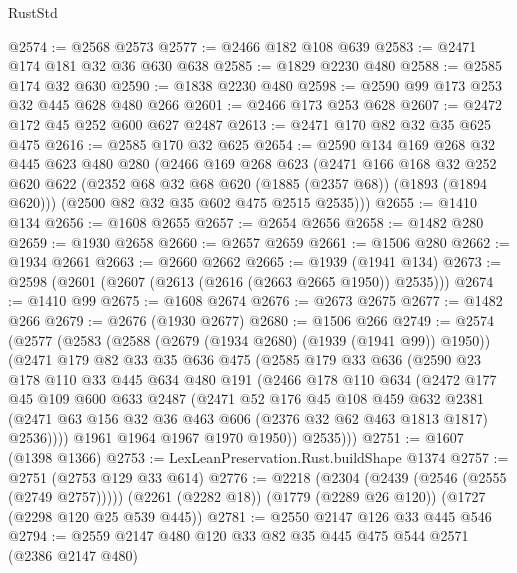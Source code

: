 \begin{lexlean}{RustStd}
\begin{coremodule}
@2574 := @2568 @2573
@2577 := @2466 @182 @108 @639
@2583 := @2471 @174 @181 @32 @36 @630 @638
@2585 := @1829 @2230 @480
@2588 := @2585 @174 @32 @630
@2590 := @1838 @2230 @480
@2598 := @2590 @99 @173 @253 @32 @445 @628 @480 @266
@2601 := @2466 @173 @253 @628
@2607 := @2472 @172 @45 @252 @600 @627 @2487
@2613 := @2471 @170 @82 @32 @35 @625 @475
@2616 := @2585 @170 @32 @625
@2654 := @2590
    @134
    @169
    @268
    @32
    @445
    @623
    @480
    @280
    (@2466
      @169
      @268
      @623
      (@2471
        @166
        @168
        @32
        @252
        @620
        @622
        (@2352 @68 @32 @68 @620 (@1885 (@2357 @68)) (@1893 (@1894 @620)))
        (@2500 @82 @32 @35 @602 @475 @2515 @2535)))
@2655 := @1410 @134
@2656 := @1608 @2655
@2657 := @2654 @2656
@2658 := @1482 @280
@2659 := @1930 @2658
@2660 := @2657 @2659
@2661 := @1506 @280
@2662 := @1934 @2661
@2663 := @2660 @2662
@2665 := @1939 (@1941 @134)
@2673 := @2598 (@2601 (@2607 (@2613 (@2616 (@2663 @2665 @1950)) @2535)))
@2674 := @1410 @99
@2675 := @1608 @2674
@2676 := @2673 @2675
@2677 := @1482 @266
@2679 := @2676 (@1930 @2677)
@2680 := @1506 @266
@2749 := @2574
    (@2577
      (@2583
        (@2588 (@2679 (@1934 @2680) (@1939 (@1941 @99)) @1950))
        (@2471
          @179
          @82
          @33
          @35
          @636
          @475
          (@2585
            @179
            @33
            @636
            (@2590
              @23
              @178
              @110
              @33
              @445
              @634
              @480
              @191
              (@2466
                @178
                @110
                @634
                (@2472
                  @177
                  @45
                  @109
                  @600
                  @633
                  @2487
                  (@2471
                    @52
                    @176
                    @45
                    @108
                    @459
                    @632
                    @2381
                    (@2471 @63 @156 @32 @36 @463 @606 (@2376 @32 @62 @463 @1813 @1817) @2536))))
              @1961
              @1964
              @1967
              @1970
              @1950))
          @2535)))
@2751 := @1607 (@1398 @1366)
@2753 := LexLeanPreservation.Rust.buildShape @1374
@2757 := @2751 (@2753 @129 @33 @614)
@2776 := @2218
    (@2304 (@2439 (@2546 (@2555 (@2749 @2757)))))
    (@2261 (@2282 @18))
    (@1779 (@2289 @26 @120))
    (@1727 (@2298 @120 @25 @539 @445))
@2781 := @2550 @2147 @126 @33 @445 @546
@2794 := @2559 @2147 @480 @120 @33 @82 @35 @445 @475 @544 @2571 (@2386 @2147 @480)

\end{coremodule}
\end{lexlean}
